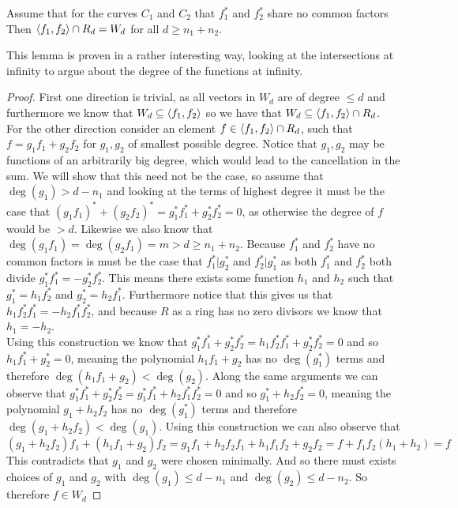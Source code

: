 \begin{lemma}
    \label{lem:23}
    Assume that for the curves $C_1$ and $C_2$ that $f_1^*$ and $f_2^*$ share no common factors Then $\left\langle f_1,f_2 \right\rangle\cap R_d=W_d$ for all $d\geq n_1+n_2$.
\end{lemma}
This lemma is proven in a rather interesting way, looking at the intersections at infinity to argue about the degree of the functions at infinity.
\begin{proof}
    First one direction is trivial, as all vectors in $W_d$ are of degree $\leq d$ and furthermore we know that $W_d\subseteq \left\langle f_1,f_2 \right\rangle$ so we have that $W_d\subseteq \left\langle f_1,f_2 \right\rangle\cap R_d$.\\

    For the other direction consider an element $f\in \left\langle f_1,f_2 \right\rangle\cap R_d$, such that $f=g_1f_1+g_2f_2$ for $g_1,g_2$ of smallest possible degree. Notice that $g_1,g_2$ may be functions of an arbitrarily big degree, which would lead to the cancellation in the sum. We will show that this need not be the case, so assume that $\deg(g_1)>d-n_1$ 
    and looking at the terms of highest degree it must be the case that $(g_1f_1)^*+(g_2f_2)^*=g_1^*f_1^*+g_2^*f_2^*=0$, as otherwise the degree of $f$ would be $>d$. Likewise we also know that $\deg(g_1f_1)=\deg(g_2f_1)=m>d\geq n_1+n_2$. Because $f_1^*$ and $f_2^*$ have no common factors is must be the case that $f_1^*|g_2^*$ and $f_2^*|g_1^*$ as both $f_1^*$ and $f_2^*$ both divide $g_1^*f_1^*=-g_2^*f_2^*$. This means there exists some function $h_1$ and $h_2$ such that $g_1^*=h_1f_2^*$ and $g_2^*=h_2f_1^*$. Furthermore notice that this gives us that $h_1f_2^*f_1^*=-h_2f_1^*f_2^*$, and because $R$ as a ring has no zero divisors we know that $h_1=-h_2$.\\

    Using this construction we know that $g_1^*f_1^*+g_2^*f_2^*=h_1f_2^*f_1^*+g_2^*f_2^*=0$ and so $h_1f_1^*+g^*_2=0$, meaning the polynomial $h_1f_1+g_2$ has no $\deg(g_1^*)$ terms and therefore $\deg(h_1f_1+g_2)<\deg(g_2)$. Along the same arguments we can observe that $g_1^*f_1^*+g_2^*f_2^*=g_1^*f_1^*+h_2f_1^*f_2^*=0$ and so $g_1^*+h_2f_2^*=0$, meaning the polynomial $g_1+h_2f_2$ has no $\deg(g_1^*)$ terms and therefore $\deg(g_1+h_2f_2)<\deg(g_1)$. Using this construction we can also observe that 
    $$(g_1+h_2f_2)f_1+(h_1f_1+g_2)f_2=g_1f_1+h_2f_2f_1+h_1f_1f_2+g_2f_2=f+f_1f_2(h_1+h_2)=f$$
    This contradicts that $g_1$ and $g_2$ were chosen minimally. And so there must exists choices of $g_1$ and $g_2$ with $\deg(g_1)\leq d-n_1$ and $\deg(g_2)\leq d-n_2$. So therefore $f\in W_d$
\end{proof}

